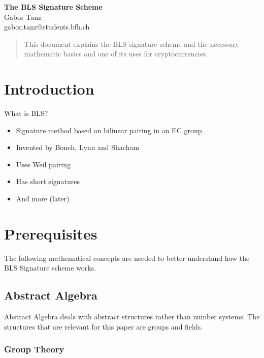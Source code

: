 \documentclass[a4paper,12pt]{scrartcl}
\begin{document}
\begin{titlepage}
\begin{center}
\vspace*{3cm}
\vspace{1cm}
\Huge \textbf{The BLS Signature Scheme} \\
\vspace{6cm}
\vspace{1cm}
\large Gabor Tanz \\ gabor.tanz@students.bfh.ch \\
\end{center}
\end{titlepage}

\tableofcontents
\pagebreak

\begin{abstract}
	This document explains the BLS signature scheme and the necessary mathematic basics and one of its uses for cryptocurrencies.
\end{abstract}
\pagebreak

\section{Introduction}
	What is BLS?
\begin{itemize}
	\item Signature method based on bilinear pairing in an EC group
	\item Invented by Boneh, Lynn and Shacham
	\item Uses Weil pairing
	\item Has short signatures
	\item And more (later)
\end{itemize}

\pagebreak

\section{Prerequisites}
The following mathematical concepts are needed to better understand how the BLS Signature scheme works.
\subsection{Abstract Algebra}
Abstract Algebra deals with abstract structures rather than number systems. The structures that are relevant for this paper are groups and fields.
\subsubsection{Group Theory}
\end{document}
